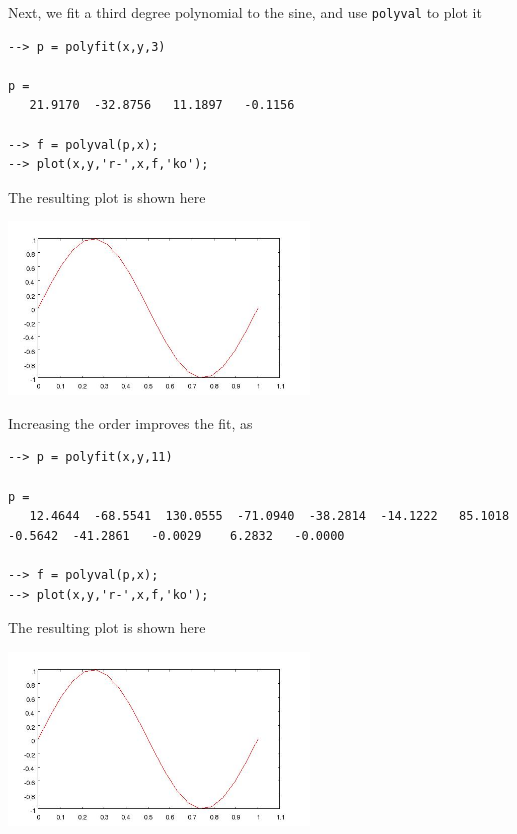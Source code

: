 Next, we fit a third degree polynomial to the sine, and use
\verb|polyval| to plot it
\begin{verbatim}
--> p = polyfit(x,y,3)

p = 
   21.9170  -32.8756   11.1897   -0.1156 

--> f = polyval(p,x);
--> plot(x,y,'r-',x,f,'ko');
\end{verbatim}
The resulting plot is shown here


\centerline{\includegraphics[width=8cm]{polyfit2}}

Increasing the order improves the fit, as
\begin{verbatim}
--> p = polyfit(x,y,11)

p = 
   12.4644  -68.5541  130.0555  -71.0940  -38.2814  -14.1222   85.1018   -0.5642  -41.2861   -0.0029    6.2832   -0.0000 

--> f = polyval(p,x);
--> plot(x,y,'r-',x,f,'ko');
\end{verbatim}
The resulting plot is shown here


\centerline{\includegraphics[width=8cm]{polyfit3}}

